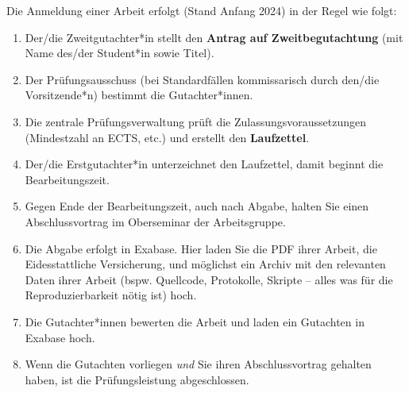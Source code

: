 Die Anmeldung einer Arbeit erfolgt (Stand Anfang 2024) in der Regel wie folgt:

\begin{enumerate}
\item
Der/die Zweitgutachter*in stellt den \textbf{Antrag auf Zweitbegutachtung} (mit Name des/der Student*in sowie Titel).
\item
Der Prüfungsausschuss (bei Standardfällen kommissarisch durch den/die Vorsitzende*n) bestimmt die Gutachter*innen.
\item
Die zentrale Prüfungsverwaltung prüft die Zulassungsvoraussetzungen (Mindestzahl an ECTS, etc.) und erstellt den \textbf{Laufzettel}.
\item
Der/die Erstgutachter*in unterzeichnet den Laufzettel, damit beginnt die Bearbeitungszeit.
\item
Gegen Ende der Bearbeitungszeit, auch nach Abgabe, halten Sie einen Abschlussvortrag im Oberseminar der Arbeitsgruppe.
\item
Die Abgabe erfolgt in Exabase. Hier laden Sie die PDF ihrer Arbeit, die Eidesstattliche Versicherung,
und möglichst ein Archiv mit den relevanten Daten ihrer Arbeit (bspw.{} Quellcode, Protokolle, Skripte -- alles was für die Reproduzierbarkeit nötig ist) hoch.
\item
Die Gutachter*innen bewerten die Arbeit und laden ein Gutachten in Exabase hoch.
\item
Wenn die Gutachten vorliegen \emph{und} Sie ihren Abschlussvortrag gehalten haben, ist die Prüfungsleistung abgeschlossen.
\end{enumerate}

